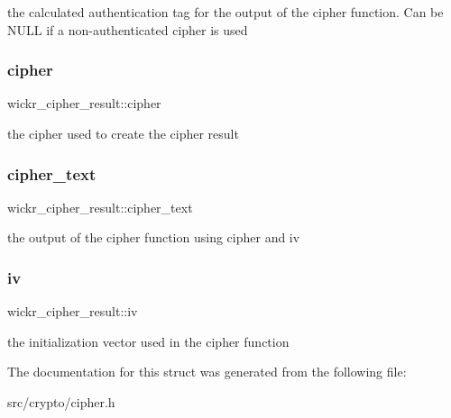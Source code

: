 the calculated authentication tag for the output of the cipher function. Can be N\+U\+LL if a non-\/authenticated cipher is used \mbox{\label{structwickr__cipher__result_a80f15a012dbe1342d0aaa6f3e7072aa9}} 
\subsubsection{\texorpdfstring{cipher}{cipher}}
{\footnotesize\ttfamily wickr\+\_\+cipher\+\_\+result\+::cipher}

the cipher used to create the cipher result \mbox{\label{structwickr__cipher__result_a29fe7c04025f39cc574ac41f846d167a}} 
\subsubsection{\texorpdfstring{cipher\+\_\+text}{cipher\_text}}
{\footnotesize\ttfamily wickr\+\_\+cipher\+\_\+result\+::cipher\+\_\+text}

the output of the cipher function using \textquotesingle{}cipher\textquotesingle{} and \textquotesingle{}iv\textquotesingle{} \mbox{\label{structwickr__cipher__result_a741b49cc09cddfce1924e7a26ab8b35b}} 
\subsubsection{\texorpdfstring{iv}{iv}}
{\footnotesize\ttfamily wickr\+\_\+cipher\+\_\+result\+::iv}

the initialization vector used in the cipher function 

The documentation for this struct was generated from the following file\+:\begin{DoxyCompactItemize}
\item 
src/crypto/cipher.\+h\end{DoxyCompactItemize}
